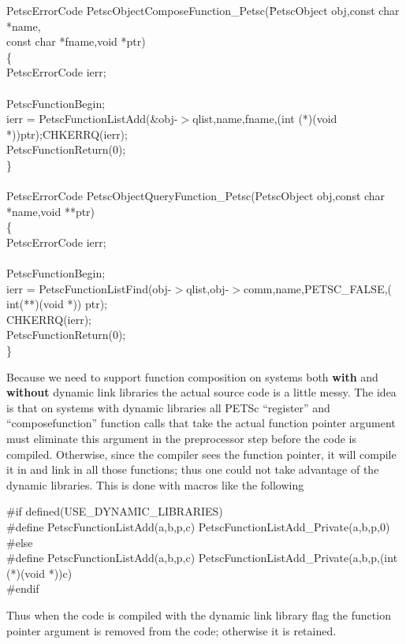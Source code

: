 \documentclass[twoside,12pt]{../sty/report_petsc}
\begin{document}
\begin{tabbing}
PetscErrorCode PetscObjectComposeFunction\_Petsc(\=PetscObject obj,const char *name,\\
   \> const char *fname,void *ptr)\\
\{\\
  PetscErrorCode ierr;\\
\\
  PetscFunctionBegin;\\
  ierr = PetscFunctionListAdd(\&obj-$>$qlist,name,fname,(int (*)(void *))ptr);CHKERRQ(ierr);\\
  PetscFunctionReturn(0);\\
\}\\
\\
PetscErrorCode PetscObjectQueryFunction\_Petsc(PetscObject obj,const char *name,void **ptr)\\
\{\\
  PetscErrorCode ierr;\\
\\
  PetscFunctionBegin;\\
  ierr = PetscFunctionListFind(obj-$>$qlist,obj-$>$comm,name,PETSC\_FALSE,( int(**)(void *)) ptr);\\
  CHKERRQ(ierr);\\
  PetscFunctionReturn(0);\\
\}
\end{tabbing}

  Because we need to support function composition on systems both {\bf with} and {\bf without}
dynamic link libraries the actual source code is a little messy. The idea is that
on systems with dynamic libraries all PETSc ``register'' and ``composefunction''
function calls that take the actual
function pointer argument must eliminate this argument in the preprocessor step before
the code is compiled. Otherwise, since the compiler sees the function pointer, it will
compile it in and link in all those functions; thus one could not take advantage of the
dynamic libraries. This is done with macros like the following
\begin{tabbing}
\#if defined(USE\_DYNAMIC\_LIBRARIES)\\
\#define       PetscFunctionListAdd(a,b,p,c) PetscFunctionListAdd\_Private(a,b,p,0)\\
\#else\\
\#define       PetscFunctionListAdd(a,b,p,c) PetscFunctionListAdd\_Private(a,b,p,(int (*)(void *))c)\\
\#endif\\
\end{tabbing}
Thus when the code is compiled with the dynamic link library flag the function pointer
argument is removed from the code; otherwise it is retained.
\end{document}
